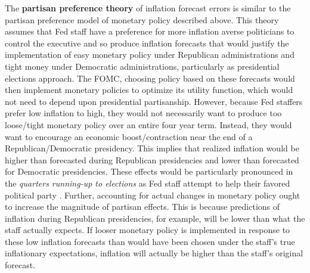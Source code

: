 \documentclass[a4paper]{article}\usepackage{graphicx, color}
\begin{document}
The {\bf{partisan preference theory}} of inflation forecast errors is similar to the partisan preference model of monetary policy described above. This theory assumes that Fed staff have a preference for more inflation averse politicians to control the executive and so produce inflation forecasts that would justify the implementation of easy monetary policy under Republican administrations and tight money under Democratic administrations, particularly as presidential elections approach. The FOMC, choosing policy based on these forecasts would then implement monetary policies to optimize its utility function, which would not need to depend upon presidential partisanship. However, because Fed staffers prefer low inflation to high, they would not necessarily want to produce too loose/tight monetary policy over an entire four year term. Instead, they would want to encourage an economic boost/contraction near the end of a Republican/Democratic presidency. This implies that realized inflation would be higher than forecasted during Republican presidencies and lower than forecasted for Democratic presidencies. These effects would be particularly pronounced in the {\emph{quarters running-up to elections}} as Fed staff attempt to help their favored political party \citep{Beck1987,Grier1987}. Further, accounting for actual changes in monetary policy ought to increase the magnitude of partisan effects. This is because predictions of inflation during Republican presidencies, for example, will be lower than what the staff actually expects. If looser monetary policy is implemented in response to these low inflation forecasts than would have been chosen under the staff's true inflationary expectations, inflation will actually be higher than the staff's original forecast.
\end{document}
